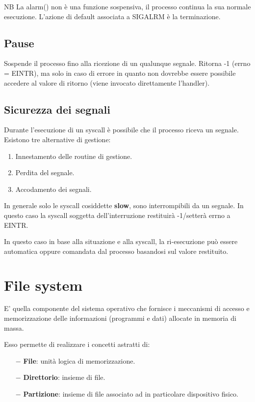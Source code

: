 \documentclass{article}
\begin{document}
\noindent NB La alarm() non è una funzione sospensiva, il processo 
continua la sua normale esecuzione. L'azione di default associata
a SIGALRM è la terminazione.

\subsection{Pause}
\noindent {} 
\medskip

\noindent Sospende il processo fino alla ricezione di un qualunque 
segnale.
Ritorna -1 (errno = EINTR), ma solo in caso di errore in quanto
 non dovrebbe essere possibile accedere al valore di ritorno
 (viene invocato direttamente l'handler). 

 \subsection{Sicurezza dei segnali}
 Durante l'esecuzione di un syscall è possibile che il processo
 riceva un segnale. Esistono tre alternative di gestione:
 \begin{enumerate}
     \item Innestamento delle routine di gestione.
     \item Perdita del segnale.
     \item Accodamento dei segnali.
 \end{enumerate}

 \noindent In generale solo le syscall cosiddette \textbf{slow}, sono
 interrompibili da un segnale. In questo caso la syscall soggetta 
 dell'interruzione restituirà -1/setterà errno a EINTR.

 \noindent In questo caso in base alla situazione e alla syscall, la ri-esecuzione
 può essere automatica oppure comandata dal processo basandosi sul 
 valore restituito.
\pagebreak

\section{File system}

\noindent E' quella componente del sistema operativo che
fornisce i meccanismi di accesso e memorizzazione delle
informazioni (programmi e dati) allocate in memoria di 
 massa.

 Esso permette di realizzare i concetti astratti di:
 \begin{itemize}
     \item[$-$]\textbf{File}: unità logica di memorizzazione.
     \item[$-$]\textbf{Direttorio}: insieme di file.
     \item[$-$]\textbf{Partizione}: insieme di file associato
     ad in particolare dispositivo fisico.
 \end{itemize}
\end{document}
